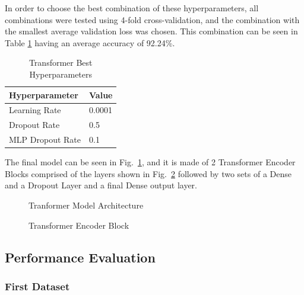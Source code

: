 In order to choose the best combination of these hyperparameters, all combinations were
tested using 4-fold cross-validation, and the combination with the smallest average validation loss was chosen. This combination can be seen in Table \ref{table:transformer_best_hyperparameters}
having an average accuracy of 92.24\%.

\begin{table}[H]
    \centering
    \caption{Transformer Best Hyperparameters}
    \label{table:transformer_best_hyperparameters}
    \begin{tabular}{|l|l|}
        \hline
        Hyperparameter & Value \\
        \hline
        Learning Rate & 0.0001 \\
        \hline
        Dropout Rate & 0.5 \\
        \hline
        MLP Dropout Rate & 0.1 \\
        \hline
    \end{tabular}
\end{table}

The final model can be seen in Fig.~\ref{fig:transformer_architecture2}, and it is made of 2 Transformer Encoder Blocks comprised of the layers shown in Fig.~\ref{fig:transformer_architecture1} followed by two sets of a Dense and a Dropout Layer and a final Dense output layer.

\begin{figure}[H]
    \centering
    {\fontsize{10}{12}\selectfont}
    \caption[Tranformer Model Architecture]{Tranformer Model Architecture}
    \label{fig:transformer_architecture2}
\end{figure}

\begin{figure}[H]
    \centering
    {\fontsize{10}{12}\selectfont}
    \caption[Transformer Encoder Block]{Transformer Encoder Block}
    \label{fig:transformer_architecture1}
\end{figure}

\subsection{Performance Evaluation}

\subsubsection{First Dataset}

